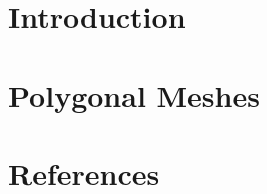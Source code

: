 \documentclass[10pt]{beamer}
\title{\presentationtitle}
\subtitle{Advanced Programming for Scientific Computing}
\author[Andrea Di Antonio]{Andrea Di Antonio \\ Supervised by Professors Paola F. Antonietti and Marco Verani} %
\date{Exam session of September 10, 2024 \\ Academic Year 2023-24}
\begin{document}
    \begin{frame}
        \titlepage
    \end{frame}

    \section{Introduction}
    

	\section{Polygonal Meshes}
	

	\section{References}
	
\end{document}
